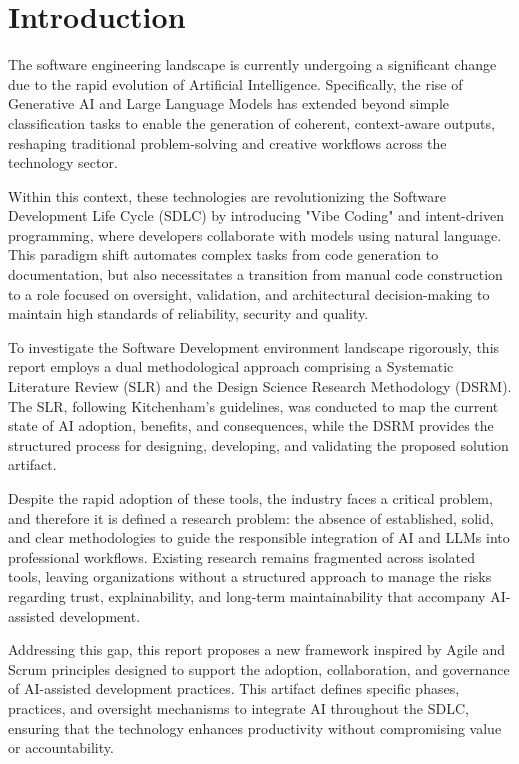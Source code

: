 
\section{Introduction}

The software engineering landscape is currently undergoing a significant change due to the rapid evolution of Artificial Intelligence. Specifically, the rise of Generative AI and Large Language Models has extended beyond simple classification tasks to enable the generation of coherent, context-aware outputs, reshaping traditional problem-solving and creative workflows across the technology sector.

Within this context, these technologies are revolutionizing the Software Development Life Cycle (SDLC) by introducing "Vibe Coding" and intent-driven programming, where developers collaborate with models using natural language. This paradigm shift automates complex tasks from code generation to documentation, but also necessitates a transition from manual code construction to a role focused on oversight, validation, and architectural decision-making to maintain high standards of reliability, security and quality.

To investigate the Software Development environment landscape rigorously, this report employs a dual methodological approach comprising a Systematic Literature Review (SLR) and the Design Science Research Methodology (DSRM). The SLR, following Kitchenham’s guidelines, was conducted to map the current state of AI adoption, benefits, and consequences, while the DSRM provides the structured process for designing, developing, and validating the proposed solution artifact.

Despite the rapid adoption of these tools, the industry faces a critical problem, and therefore it is defined a research problem: the absence of established, solid, and clear methodologies to guide the responsible integration of AI and LLMs into professional workflows. Existing research remains fragmented across isolated tools, leaving organizations without a structured approach to manage the risks regarding trust, explainability, and long-term maintainability that accompany AI-assisted development.

Addressing this gap, this report proposes a new framework inspired by Agile and Scrum principles designed to support the adoption, collaboration, and governance of AI-assisted development practices. This artifact defines specific phases, practices, and oversight mechanisms to integrate AI throughout the SDLC, ensuring that the technology enhances productivity without compromising value or accountability.

